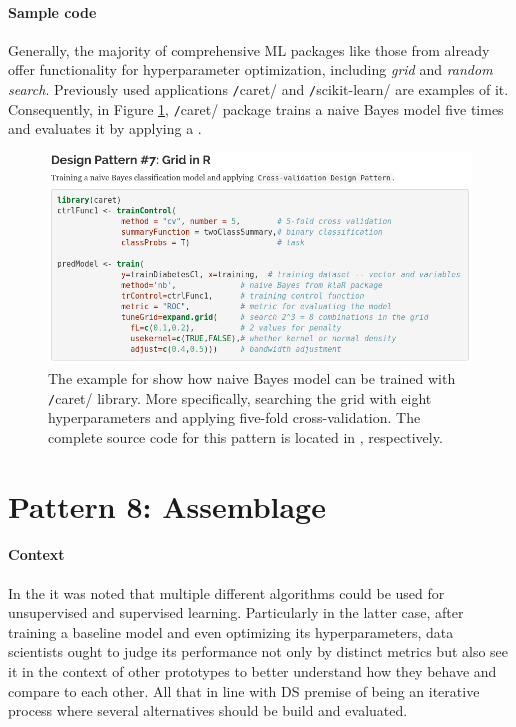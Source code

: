 \paragraph*{Sample code}
Generally, the majority of comprehensive \ac{ML} packages like those from  already offer functionality for hyperparameter optimization, including \emph{grid} and \emph{random search}.
Previously used applications \texttt/caret/ and \texttt/scikit-learn/ are examples of it.
Consequently, in Figure \ref{lst:code_pattern8}, \texttt/caret/ package trains a naive Bayes model five times and evaluates it by applying a .

\begin{figure}[h]
\centering
\includegraphics[width=\textwidth,height=\textheight,keepaspectratio]{images_dp/code_listing_7_grid}
\caption[Example for Grid Design Pattern.]{The example for  show how naive Bayes model can be trained with \texttt/caret/ library. 
More specifically, searching the grid with eight hyperparameters and applying five-fold cross-validation.
The complete source code for this pattern is located in ,  respectively.}
\label{lst:code_pattern8}
\end{figure}

\section{Pattern 8: Assemblage}

\paragraph*{Context}
In the  it was noted that multiple different algorithms could be used for unsupervised and supervised learning. 
Particularly in the latter case, after training a baseline model and even optimizing its hyperparameters, data scientists ought to judge its performance not only by distinct metrics but also see it in the context of other prototypes to better understand how they behave and compare to each other.
All that in line with \ac{DS} premise of being an iterative process where several alternatives should be build and evaluated.

